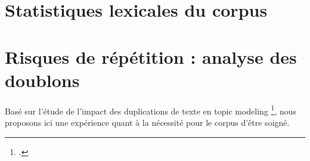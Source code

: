 \section{Statistiques lexicales du corpus}
\label{subsec:corpus_lexical_stats}

\section{Risques de répétition : analyse des doublons}
\label{subsec:corpus_repetition}

Basé sur l'étude de l'impact des duplications de texte en topic modeling \footcite{schofield2017quantifying}, nous proposons ici une expérience
quant à la nécessité pour le corpus d'être soigné.

